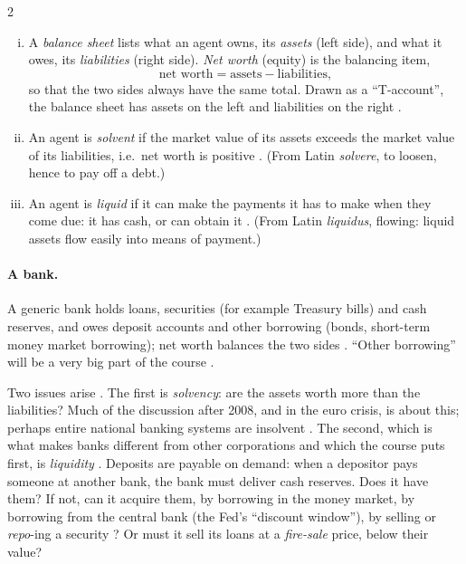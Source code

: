 \begin{paracol}{2}
\begin{definition}\label{def:fp-bs}
\leavevmode
\begin{enumerate}[(i)]
  \item A \emph{balance sheet} lists what an agent owns, its \emph{assets} (left side), and what it owes, its
        \emph{liabilities} (right side). \emph{Net worth} (equity) is the balancing item,
        \[ \text{net worth} = \text{assets} - \text{liabilities}, \]
        so that the two sides always have the same total. Drawn as a ``T-account'', the balance sheet has assets
        on the left and liabilities on the right .
  \item An agent is \emph{solvent} if the market value of its assets exceeds the market value of its
        liabilities, i.e.\ net worth is positive . (From Latin \emph{solvere}, to loosen,
        hence to pay off a debt.)
  \item An agent is \emph{liquid} if it can make the payments it has to make when they come due: it has cash, or
        can obtain it . (From Latin \emph{liquidus}, flowing: liquid assets flow easily into
        means of payment.)
\end{enumerate}
\end{definition}

\paragraph{A bank.} A generic bank holds loans, securities (for example Treasury bills) and cash reserves, and
owes deposit accounts and other borrowing (bonds, short-term money market borrowing); net worth balances the two
sides . ``Other borrowing'' will be a very big part of the course .
\begin{taccts}
\end{taccts}
Two issues arise . The first is \emph{solvency}: are the assets worth more than the liabilities?
Much of the discussion after 2008, and in the euro crisis, is about this; perhaps entire national banking systems
are insolvent . The second, which is what makes banks different from other corporations and which
the course puts first, is \emph{liquidity} . Deposits are payable on demand: when a depositor pays
someone at another bank, the bank must deliver cash reserves. Does it have them? If not, can it acquire them, by
borrowing in the money market, by borrowing from the central bank (the Fed's ``discount window''), by selling or
\emph{repo}-ing a security ? Or must it sell its loans at a \emph{fire-sale} price, below their
value?


\end{paracol}
